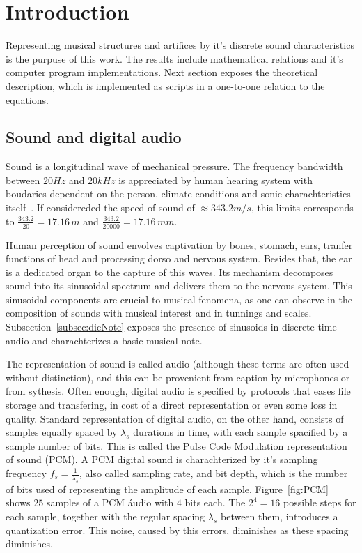 \documentclass[
 aip,
 jmp,
 amsmath,amssymb,
 reprint,
]{revtex4-1}
\begin{document}
\section{\label{sec:level1}Introduction}

Representing musical structures and artifices by it's discrete sound characteristics is the purpuse of this work. The results include mathematical relations and it's computer program implementations. Next section exposes the theoretical description, which is implemented as scripts in a one-to-one relation to the equations.

\subsection{Sound and digital audio}

Sound is a longitudinal wave of mechanical pressure. The frequency bandwidth between $20Hz$ and $20kHz$ is appreciated by human hearing system with boudaries dependent on the person, climate conditions and sonic charachteristics itself~\cite{Roederer}. If considereded the speed of sound of $\approx 343.2 m/s$, this limits corresponds to $\frac{343.2}{20} = 17.16\,m$ and $\frac{343.2}{20000}=17.16\,mm$.

Human perception of sound envolves captivation by bones, stomach, ears, tranfer functions of head and processing dorso and nervous system. Besides that, the ear is a dedicated organ to the capture of this waves. Its mechanism decomposes sound into its sinusoidal spectrum and delivers them to the nervous system. This sinusoidal components are crucial to musical fenomena, as one can observe in the composition of sounds with musical interest and in tunnings and scales. Subsection~\ref{subsec:dicNote} exposes the presence of sinusoids in discrete-time audio and charachterizes a basic musical note.

The representation of sound is called audio (although these terms are often used without distinction), and this can be provenient from caption by microphones or from sythesis. Often enough, digital audio is specified by protocols that eases file storage and transfering, in cost of a direct representation or even some loss in quality. Standard representation of digital audio, on the other hand, consists of samples equally spaced by $\lambda_s$ durations in time, with each sample spacified by a sample number of bits. This is called the Pulse Code Modulation representation of sound (PCM). A PCM digital sound is charachterized by it's sampling frequency $f_s=\frac{1}{\lambda_s}$, also called sampling rate, and bit depth, which is the number of bits used of representing the amplitude of each sample. Figure~\ref{fig:PCM} shows $25$ samples of a PCM áudio with $4$ bits each. The $2^4=16$ possible steps for each sample, together with the regular spacing $\lambda_s$ between them, introduces a quantization error. This noise, caused by this errors, diminishes as these spacing diminishes.
\end{document}
